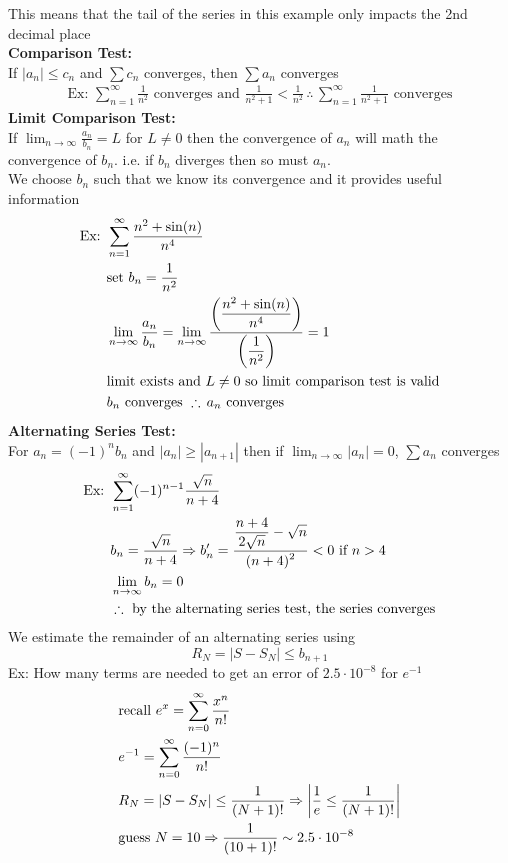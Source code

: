\documentclass[11pt, fleqn]{article}
\begin{document}
This means that the tail of the series in this example only impacts the 2nd decimal place\\
\textbf{Comparison Test:}\\
If $|a_n|\leq c_n$ and $\sum c_n$ converges, then $\sum a_n$ converges
\begin{align*}
    \text{Ex: }\sum_{n=1}^\infty\frac{1}{n^2}\text{ converges and }\frac{1}{n^2+1}<\frac{1}{n^2}\,\therefore\,\sum_{n=1}^\infty\frac{1}{n^2+1}\text{ converges}
\end{align*}
\textbf{Limit Comparison Test:}\\
If $\displaystyle{\lim_{n\to\infty}\frac{a_n}{b_n}=L}$ for $L\neq 0$ then the convergence of $a_n$ will math the convergence of $b_n$. i.e. if $b_n$ diverges then so must $a_n$.\\
We choose $b_n$ such that we know its convergence and it provides useful information
\begin{align*}
    \text{Ex: }&\sum_{n=1}^\infty\frac{n^2+\sin(n)}{n^4}\\
    &\text{set }b_n=\frac{1}{n^2}\\
    &\lim_{n\to\infty}\frac{a_n}{b_n}=\lim_{n\to\infty}\frac{\displaystyle\left( \frac{n^2+\sin(n)}{n^4} \right)}{\displaystyle\left( \frac{1}{n^2} \right)}=1\\
    &\text{limit exists and }L\neq 0\text{ so limit comparison test is valid}\\
    &b_n\text{ converges }\therefore\,a_n\text{ converges}
\end{align*}
\textbf{Alternating Series Test:}\\
For $a_n=(-1)^nb_n$ and $|a_n|\geq|a_{n+1}|$ then if $\displaystyle{\lim_{n\to\infty}|a_n|}=0$, $\sum a_n$ converges
\begin{align*}
    \text{Ex: }&\sum_{n=1}^\infty(-1)^{n-1}\frac{\sqrt{n}}{n+4}\\
    &b_n=\frac{\sqrt{n}}{n+4}\Rightarrow b_n'=\frac{\displaystyle\frac{n+4}{2\sqrt{n}}-\sqrt{n}}{\displaystyle(n+4)^2}<0\text{ if }n>4\\
    &\lim_{n\to\infty}b_n=0\\
    &\therefore\text{ by the alternating series test, the series converges}
\end{align*}
We estimate the remainder of an alternating series using
$$R_N=|S-S_N|\leq b_{n+1}$$
Ex: How many terms are needed to get an error of $2.5\cdot 10^{-8}$ for $e^{-1}$
\begin{align*}
    &\text{recall }e^x=\sum_{n=0}^\infty\frac{x^n}{n!}\\
    &e^{-1}=\sum_{n=0}^\infty\frac{(-1)^n}{n!}\\
    &R_N=|S-S_N|\leq\frac{1}{(N+1)!}\Rightarrow \left| \frac{1}{e}\leq \frac{1}{(N+1)!} \right|\\
    &\text{guess }N=10\Rightarrow \frac{1}{(10+1)!}\sim2.5\cdot10^{-8}
\end{align*}
\end{document}
